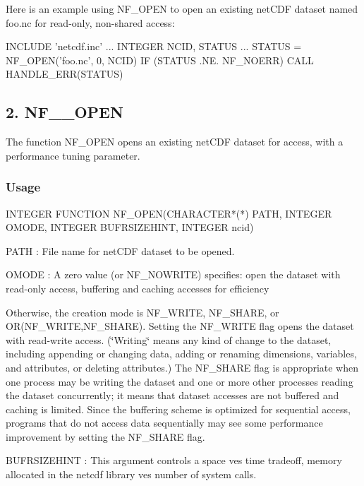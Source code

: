 Here is an example using N\+F\+\_\+\+O\+P\+EN to open an existing net\+C\+DF dataset named foo.\+nc for read-\/only, non-\/shared access\+:


\begin{DoxyCode}
INCLUDE 'netcdf.inc'
 ...
INTEGER NCID, STATUS
...
STATUS = NF\_OPEN('foo.nc', 0, NCID)
IF (STATUS .NE. NF\_NOERR) CALL HANDLE\_ERR(STATUS)
\end{DoxyCode}
\hypertarget{nc_f77_interface_guide_NF__OPEN_}{}\subsection{2. N\+F\+\_\+\+\_\+\+O\+P\+E\+N  }\label{nc_f77_interface_guide_NF__OPEN_}
The function N\+F\+\_\+\+O\+P\+EN opens an existing net\+C\+DF dataset for access, with a performance tuning parameter.

\subsubsection*{Usage}


\begin{DoxyCode}
INTEGER FUNCTION NF\_OPEN(CHARACTER*(*) PATH, INTEGER OMODE, INTEGER
BUFRSIZEHINT, INTEGER ncid)
\end{DoxyCode}


{\ttfamily P\+A\+TH} \+: File name for net\+C\+DF dataset to be opened.

{\ttfamily O\+M\+O\+DE} \+: A zero value (or N\+F\+\_\+\+N\+O\+W\+R\+I\+TE) specifies\+: open the dataset with read-\/only access, buffering and caching accesses for efficiency

Otherwise, the creation mode is N\+F\+\_\+\+W\+R\+I\+TE, N\+F\+\_\+\+S\+H\+A\+RE, or O\+R(\+N\+F\+\_\+\+W\+R\+I\+T\+E,\+N\+F\+\_\+\+S\+H\+A\+R\+E). Setting the N\+F\+\_\+\+W\+R\+I\+TE flag opens the dataset with read-\/write access. (\char`\"{}\+Writing\char`\"{} means any kind of change to the dataset, including appending or changing data, adding or renaming dimensions, variables, and attributes, or deleting attributes.) The N\+F\+\_\+\+S\+H\+A\+RE flag is appropriate when one process may be writing the dataset and one or more other processes reading the dataset concurrently; it means that dataset accesses are not buffered and caching is limited. Since the buffering scheme is optimized for sequential access, programs that do not access data sequentially may see some performance improvement by setting the N\+F\+\_\+\+S\+H\+A\+RE flag.

{\ttfamily B\+U\+F\+R\+S\+I\+Z\+E\+H\+I\+NT} \+: This argument controls a space ves time tradeoff, memory allocated in the netcdf library ves number of system calls.

